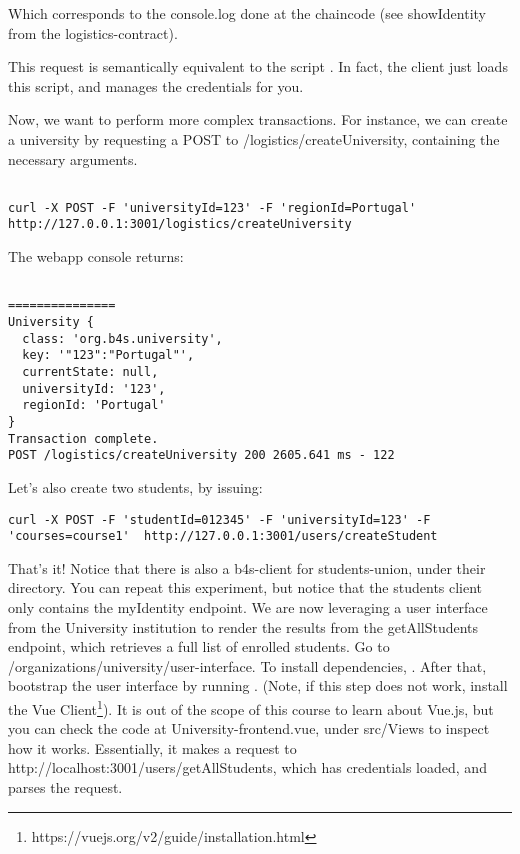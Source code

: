\documentclass[12pt,a4paper]{article}
\theoremstyle{definition}
\begin{document}
Which corresponds to the console.log done at the chaincode (see showIdentity from the logistics-contract).

This request is semantically equivalent to the script . In fact, the client just loads this script, and manages the credentials for you.  



Now, we want to perform more complex transactions. For instance, we can create a university by requesting a POST to /logistics/createUniversity, containing the necessary arguments. 
\begin{verbatim}

curl -X POST -F 'universityId=123' -F 'regionId=Portugal' http://127.0.0.1:3001/logistics/createUniversity
\end{verbatim}

The webapp console returns:

\begin{verbatim}

===============
University {
  class: 'org.b4s.university',
  key: '"123":"Portugal"',
  currentState: null,
  universityId: '123',
  regionId: 'Portugal'
}
Transaction complete.
POST /logistics/createUniversity 200 2605.641 ms - 122

\end{verbatim}

Let's also create two students, by issuing:
\begin{verbatim}
curl -X POST -F 'studentId=012345' -F 'universityId=123' -F 'courses=course1'  http://127.0.0.1:3001/users/createStudent
\end{verbatim}



That's it! Notice that there is also a b4s-client for students-union, under their directory. You can repeat this experiment, but notice that the students client only contains the myIdentity endpoint. We are now leveraging a user interface from the University institution to render the results from the getAllStudents endpoint, which retrieves a full list of enrolled students. Go to /organizations/university/user-interface. To install dependencies, . After that, bootstrap the user interface by running . (Note, if this step does not work, install the Vue Client\footnote{https://vuejs.org/v2/guide/installation.html}). It is out of the scope of this course to learn about Vue.js, but you can check the code at University-frontend.vue, under src/Views to inspect how it works. Essentially, it makes a request to http://localhost:3001/users/getAllStudents, which has credentials loaded, and parses the request.
\end{document}
